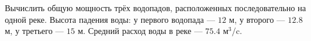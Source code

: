 Вычислить общую мощность трёх водопадов, расположенных последовательно
на одной реке. Высота падения воды: у первого водопада --- $12$ м, у
второго --- $12.8$ м, у третьего --- $15$ м. Средний расход воды
в реке --- $75.4$ м$^3$/c.
